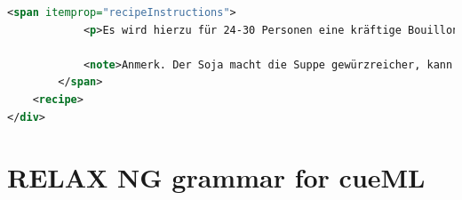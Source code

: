 \documentclass[12pt, twoside]{report}
\begin{document}
\begin{lstlisting}[language=XML, caption={Enriched with cueML}]
		<span itemprop="recipeInstructions">
			<p>Es wird hierzu für 24-30 Personen eine kräftige Bouillon von 8-10 Pfund Rindfleisch mit Wurzelwerk gekocht. Zugleich bringt man einen großen Kalbskopf, eine Schweineschnauze und Ohren, einen Ochsengaumen und eine geräucherte Ochsenzunge zu Feuer und kocht dies Alles gahr, aber nicht zu weich. Kalt, schneidet man es in kleine, länglich viereckige Stückchen, gibt das Fleisch in die Bouillon, nebst braunem Gewürz, ein Paar Messerspitzen Cayenne-Pfeffer, einige Kalbsmidder in Stückchen geschnitten (siehe Vorbereitungsregeln), kleine Saucissen, so viel Kalbskopfbrühe, daß man hinreichend Suppe hat, und macht dies mit in Butter braun gemachtem Mehl gebunden. Nachdem dies Alles 1/4 Stunde gekocht hat, kommen noch Klöße von Kalbfleisch, einige hart gekochte Eier in Würfel geschnitten, ein Paar Eßlöffel Engl. Soja hinzu, und wenn die Klößchen einige Minuten gekocht haben, 1/2 Flasche Madeira und auch Austern, wenn man sie haben kann. Dann wird die Suppe sogleich angerichtet. </p>

			<note>Anmerk. Der Soja macht die Suppe gewürzreicher, kann jedoch gut wegbleiben, und statt Madeira kann man weißen Franzwein und etwas Rum nehmen. Sowohl die Bouillon als Kalbskopf können schon am vorhergehenden Tage, ohne Nachtheil der Suppe, gekocht werden. </note>
		</span>
	<recipe>
</div>		
\end{lstlisting}

\chapter{RELAX NG grammar for cueML} \label{appendix:grammaCueML}


\printbibliography
\end{document}
